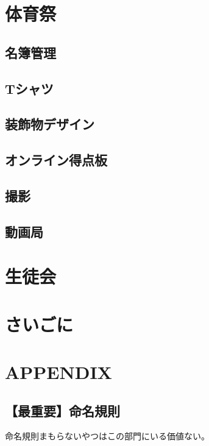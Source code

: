 \documentclass[dvipdfmx,jb5]{jarticle}
\begin{document}
\section{体育祭}
\subsection{名簿管理}
\subsection{Tシャツ}
\subsection{装飾物デザイン}
\subsection{オンライン得点板}
\subsection{撮影}
\subsection{動画局}


\section{生徒会}

\section{さいごに}
\newpage
\section{APPENDIX}
\subsection{【最重要】命名規則}
命名規則まもらないやつはこの部門にいる価値ない。
\end{document}
